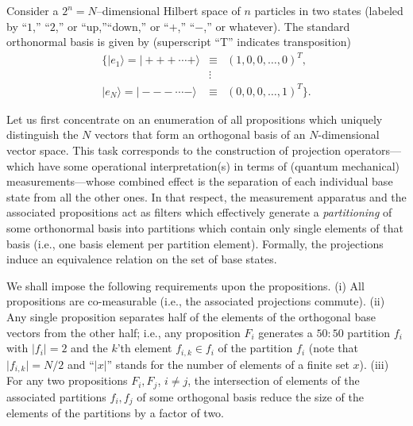 


Consider a $2^n=N$--dimensional
Hilbert space of $n$ particles in two states (labeled by ``$1$,'' ``$2$,''
or ``up,''``down,'' or ``$+$,'' ``$-$,'' or whatever).
The standard orthonormal basis is given by
(superscript ``T'' indicates transposition)
\begin{eqnarray}
\{|e_1\rangle = |+++\cdots +\rangle &\equiv& (1,0,0,\ldots ,0)^T,
\nonumber \\
&\vdots&
\nonumber \\
|e_N\rangle = |---\cdots -\rangle &\equiv& (0,0,0,\ldots ,1)^T\}.
\label{2001-principle-scb}
\end{eqnarray}


Let us first concentrate on an enumeration of all propositions which uniquely distinguish
the $N$ vectors that form an orthogonal basis of an $N$-dimensional vector space.
This task corresponds
to the construction of projection operators---which have some operational interpretation(s)
in terms of (quantum mechanical) measurements---whose combined effect is
the separation of each individual base state from all the other ones.
In that respect, the measurement apparatus and the associated propositions
act as filters which effectively generate
a {\em partitioning} of some orthonormal basis into
partitions which contain only single elements of that basis
(i.e., one basis element per partition element).
Formally, the projections induce an equivalence relation on the set of base states.


We shall impose the following requirements upon the propositions.
(i) All propositions are co-measurable (i.e., the associated projections commute).
(ii) Any single proposition separates half of the elements of the orthogonal base vectors
from the other half;
i.e., any proposition $F_i$ generates a $50:50$ partition $f_i$ with $\vert f_i\vert =2$
and  the $k$'th element
$f_{i,k}\in f_i$
of the partition $f_i$ (note that $\vert f_{i,k}\vert = N/2$ and
``$\vert x \vert $'' stands for the number of elements of a finite set $x$).
(iii) For any two propositions $F_i,F_j$, $i\neq j$, the intersection
of elements of the associated partitions $f_i,f_j$ of some
orthogonal basis reduce the
size of the elements of the partitions by a factor of two.

